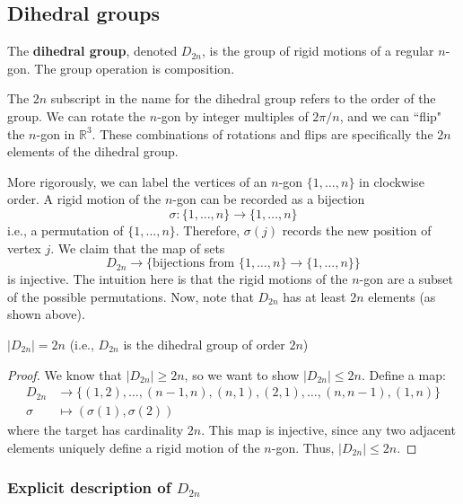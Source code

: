 \documentclass{article}
\theoremstyle{plain}
\newcommand{\R}{\mathbb{R}}
\begin{document}
\subsection{Dihedral groups}
\begin{definition}{}{}
The \textbf{dihedral group}, denoted $D_{2n}$, is the group of rigid motions of a regular $n$-gon. The group operation is composition.
\end{definition}
The $2n$ subscript in the name for the dihedral group refers to the order of the group. We can rotate the $n$-gon by integer multiples of $2\pi/n$, and we can ``flip" the $n$-gon in $\R^3$. These combinations of rotations and flips are specifically the $2n$ elements of the dihedral group.

More rigorously, we can label the vertices of an $n$-gon $\{1,\ldots,n\}$ in clockwise order. A rigid motion of the $n$-gon can be recorded as a bijection $$\sigma : \{1,\ldots,n\}\rightarrow\{1,\ldots,n\}$$
i.e., a permutation of $\{1,\ldots,n\}$. Therefore, $\sigma(j)$ records the new position of vertex $j$. We claim that the map of sets $$D_{2n}\rightarrow \{\text{bijections from } \{1,\ldots,n\} \rightarrow \{1,\ldots,n\}\}$$
is injective. The intuition here is that the rigid motions of the $n$-gon are a subset of the possible permutations. Now, note that $D_{2n}$ has at least $2n$ elements (as shown above).
\begin{theorem}{}{}
$|D_{2n}| = 2n$ (i.e., $D_{2n}$ is the dihedral group of order $2n$)
\end{theorem}
\begin{proof}
We know that $|D_{2n}| \ge 2n$, so we want to show $|D_{2n}| \le 2n$. Define a map:
\begin{align*}
D_{2n} &\rightarrow \{ (1,2),\ldots,(n-1,n), (n,1), (2,1), \ldots, (n,n-1), (1,n) \} \\
\sigma &\mapsto (\sigma(1), \sigma(2))
\end{align*}
where the target has cardinality $2n$. This map is injective, since any two adjacent elements uniquely define a rigid motion of the $n$-gon. Thus, $|D_{2n}| \le 2n$.
\end{proof}

\subsubsection{Explicit description of $D_{2n}$}
\end{document}
